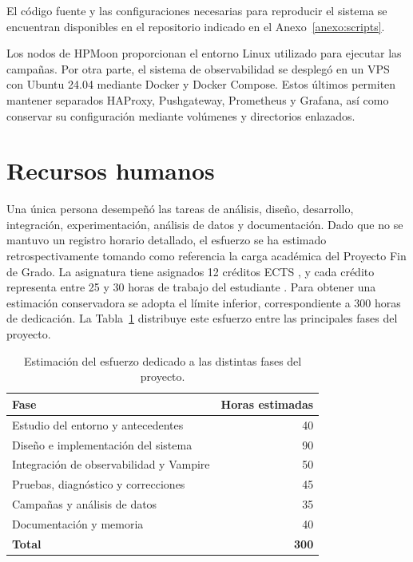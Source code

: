 El código fuente y las configuraciones necesarias para reproducir el sistema se encuentran disponibles en el repositorio indicado en el Anexo~\ref{anexo:scripts}.

Los nodos de HPMoon proporcionan el entorno Linux utilizado para ejecutar las campañas. Por otra parte, el sistema de observabilidad se desplegó en un VPS con Ubuntu 24.04 mediante Docker y Docker Compose. Estos últimos permiten mantener separados HAProxy, Pushgateway, Prometheus y Grafana, así como conservar su configuración mediante volúmenes y directorios enlazados.

\section{Recursos humanos}
\label{sec:planificacion-esfuerzo}

Una única persona desempeñó las tareas de análisis, diseño, desarrollo, integración, experimentación, análisis de datos y documentación. Dado que no se mantuvo un registro horario detallado, el esfuerzo se ha estimado retrospectivamente tomando como referencia la carga académica del Proyecto Fin de Grado. La asignatura tiene asignados 12 créditos ECTS \parencite{ugrGuiaPfg2025}, y cada crédito representa entre 25 y 30 horas de trabajo del estudiante \parencite{realDecreto1125_2003}. Para obtener una estimación conservadora se adopta el límite inferior, correspondiente a 300 horas de dedicación. La Tabla~\ref{tab:esfuerzo-fases} distribuye este esfuerzo entre las principales fases del proyecto.

\begin{table}[htbp]
    \centering
    \caption{Estimación del esfuerzo dedicado a las distintas fases del proyecto.}
    \label{tab:esfuerzo-fases}
    \begin{tabular}{p{}r}
        \hline
        \textbf{Fase} & \textbf{Horas estimadas} \\
        \hline
        Estudio del entorno y antecedentes & 40 \\
        Diseño e implementación del sistema & 90 \\
        Integración de observabilidad y Vampire & 50 \\
        Pruebas, diagnóstico y correcciones & 45 \\
        Campañas y análisis de datos & 35 \\
        Documentación y memoria & 40 \\
        \hline
        \textbf{Total} & \textbf{300} \\
        \hline
    \end{tabular}
\end{table}

